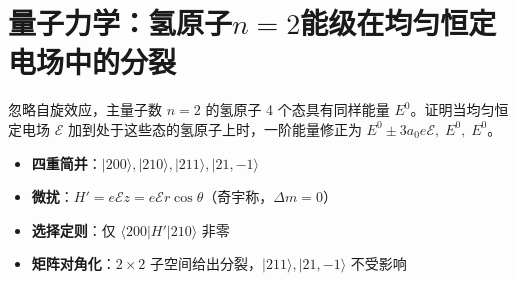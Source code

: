 \section{量子力学：氢原子\texorpdfstring{$n=2$}{n=2}能级在均匀恒定电场中的分裂}
\label{sec:hydrogen-n2-stark}

\begin{modelbox}[题目：氢原子\texorpdfstring{$n=2$}{n=2}能级在均匀恒定电场中的分裂]
忽略自旋效应，主量子数 $n=2$ 的氢原子 4 个态具有同样能量 $E^0$。证明当均匀恒定电场 $\mathcal{E}$ 加到处于这些态的氢原子上时，一阶能量修正为 $E^0\pm3a_0e\mathcal{E},\;E^0,\;E^0$。
\end{modelbox}

\begin{tipbox}[考点快速分析]
\begin{itemize}
    \item \textbf{四重简并}：$|200\rangle,|210\rangle,|211\rangle,|21,-1\rangle$
    \item \textbf{微扰}：$H'=e\mathcal{E}z=e\mathcal{E}r\cos\theta$（奇宇称，$\Delta m=0$）
    \item \textbf{选择定则}：仅 $\langle200|H'|210\rangle$ 非零
    \item \textbf{矩阵对角化}：$2\times2$ 子空间给出分裂，$|211\rangle,|21,-1\rangle$ 不受影响
\end{itemize}
\end{tipbox}

